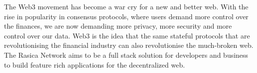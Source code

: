 The Web3 movement has become a war cry for a new and better web. With the rise in popularity in consensus protocols, where users demand more control over the finances, we are now demanding more privacy, more security and more control over our data. Web3 is the idea that the same stateful protocols that are revolutionising the financial industry can also revolutionise the much-broken web. The Rasica Network aims to be a full stack solution for developers and business to build feature rich applications for the decentralized web.
